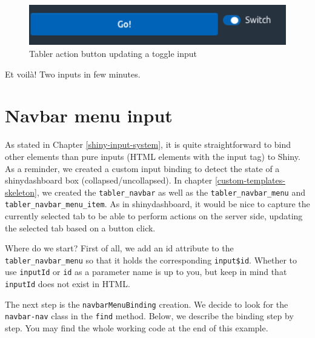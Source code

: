 \documentclass[
]{book}
\newenvironment{Shaded}{\begin{snugshade}}{\end{snugshade}}
\newcommand{\ControlFlowTok}[1]{\textcolor[rgb]{0.13,0.29,0.53}{\textbf{#1}}}
\newcommand{\DataTypeTok}[1]{\textcolor[rgb]{0.13,0.29,0.53}{#1}}
\newcommand{\KeywordTok}[1]{\textcolor[rgb]{0.13,0.29,0.53}{\textbf{#1}}}
\newcommand{\NormalTok}[1]{#1}
\newcommand{\OperatorTok}[1]{\textcolor[rgb]{0.81,0.36,0.00}{\textbf{#1}}}
\newcommand{\OtherTok}[1]{\textcolor[rgb]{0.56,0.35,0.01}{#1}}
\newcommand{\StringTok}[1]{\textcolor[rgb]{0.31,0.60,0.02}{#1}}
\begin{document}
\begin{figure}
\includegraphics[width=4.88in]{images/practice/tabler-toggle} \caption{Tabler action button updating a toggle input}\label{fig:tabler-toggle}
\end{figure}

Et voilà! Two inputs in few minutes.

\hypertarget{navbar-menu-input}{%
\section{Navbar menu input}\label{navbar-menu-input}}

As stated in Chapter \ref{shiny-input-system}, it is quite straightforward to bind other elements than pure inputs (HTML elements with the input tag) to Shiny. As a reminder, we created a custom input binding to detect the state of a shinydashboard box (collapsed/uncollapsed).
In chapter \ref{custom-templates-skeleton}, we created the \texttt{tabler\_navbar} as well as the \texttt{tabler\_navbar\_menu} and \texttt{tabler\_navbar\_menu\_item}. As in shinydashboard, it would be nice to capture the currently selected tab to be able to perform actions on the server side, updating the selected tab based on a button click.

Where do we start? First of all, we add an id attribute to the \texttt{tabler\_navbar\_menu} so that it holds the corresponding \texttt{input\$id}. Whether to use \texttt{inputId} or \texttt{id} as a parameter name is up to you, but keep in mind that \texttt{inputId} does not exist in HTML.

\begin{Shaded}
\end{Shaded}

The next step is the \texttt{navbarMenuBinding} creation. We decide to look for the \texttt{navbar-nav} class in the \texttt{find} method. Below, we describe the binding step by step. You may find the whole working code at the end of this example.
\end{document}
